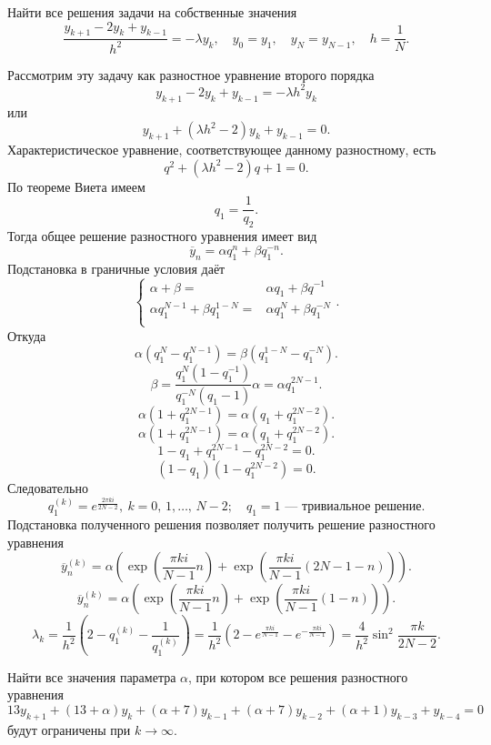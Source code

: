 \documentclass[a4paper]{article}
\begin{document}
\begin{hiProb}[7.20]
	Найти все решения задачи на собственные значения
	\[
		\frac{y_{k+1} -2 y_k +y_{k-1}}{h^2}=-\lambda
		y_k,\quad y_0=y_1,\quad y_N=y_{N-1},\quad
		h=\frac{1}{N}
	.\] 

\end{hiProb}
\begin{sol}
Рассмотрим эту задачу как разностное уравнение второго порядка
\[
	y_{k+1}-2y_k+ y_{k-1}=-\lambda h^2 y_k
\]
или
\[
	y_{k+1}+(\lambda h^2 -2)y_k +y_{k-1}=0
.\] 
Характеристическое уравнение, соответствующее данному разностному,
есть
\[
	q^2 +(\lambda h^2 -2) q+1=0
.\] 
По теореме Виета имеем
\[
q_1= \frac{1}{q_2}
.\] 
Тогда общее решение разностного уравнения имеет вид
\[
\overline{y}_n= \alpha q_1^n +\beta q_1^{-n}
.\] 
Подстановка в граничные условия даёт
\[
\left\{
\begin{aligned}
	\alpha+\beta=&\alpha q_1+ \beta q^{-1}\\
	\alpha q_1^{N-1}+\beta q_1^{1-N}=& \alpha q_1^N+\beta q_1^{-N}\\
\end{aligned}
\right.
.\] 
Откуда
\[
	\alpha \left( q_1^N-q_1^{N-1} \right) =
	\beta\left( q_1^{1-N}-q_1^{-N} \right) 
.\] 
\[
	\beta= \frac{q_1^N \left(1-q_1^{-1}\right)}{
	q_{1}^{-N}\left( q_1-1 \right) }\alpha=
	\alpha q_1^{2N-1}
.\] 
\[
	\alpha\left( 1+q_1^{2N-1} \right) =
	\alpha\left( q_1+q_1^{2N-2} \right) 
.\] 
\[
	\alpha\left( 1+ q_1^{2N-1} \right) =\alpha
	\left( q_1+q_1 ^{2N-2} \right) 
.\] 
\[
1-q_1+q_1^{2N-1}- q_1^{2N-2}=0
.\] 
\[
	\left( 1-q_1 \right) \left( 1-q_1^{2N-2} \right) =0
.\]
Следовательно
\[
	q_1^{(k)} =e^{\frac{2\pi ki}{2N-2}},\
	k=0,\,1,\ldots,\,N-2;\quad
	q_1=1\text{ --- тривиальное решение}
.\] 
Подстановка полученного решения позволяет получить решение
разностного уравнения
\[
	\overline{y}_n ^{(k)}= \alpha \left( 
		\exp \left( \frac{\pi  ki}{N-1}n \right) +
	\exp \left( \frac{\pi k i}{N-1}(2N-1-n) \right) \right) 
.\] 
\[
	\overline{y}_n ^{(k)}= \alpha \left( 
		\exp \left( \frac{\pi  ki}{N-1}n \right) +
	\exp \left( \frac{\pi k i}{N-1}(1-n) \right) \right) 
.\]
\[
	\lambda_k= \frac{1}{h^2} \left( 2-q_1 ^{(k)}- \frac{1}{q_1^{(k)}} \right) =\frac{1}{h^2}\left(  2- e^{\frac{\pi k i}{N-1}}-e^{- \frac{\pi k i }{N-1}} \right) = \frac{4}{h^2} \sin^2 \frac{\pi k}{2N-2}
.\] 
\end{sol}
\begin{hiProb}[7.10]
Найти все значения параметра $\alpha$, при котором все
решения разностного уравнения
\[
	13y_{k+1}+(13+\alpha)y_k +(\alpha+7) y_{k-1}+
	\left( \alpha+7 \right) y_{k-2}+(\alpha+1) y_{k-3}+y_{k-4}=0
\] 
будут ограничены при $k\to \infty$.
\end{hiProb}
\end{document}

